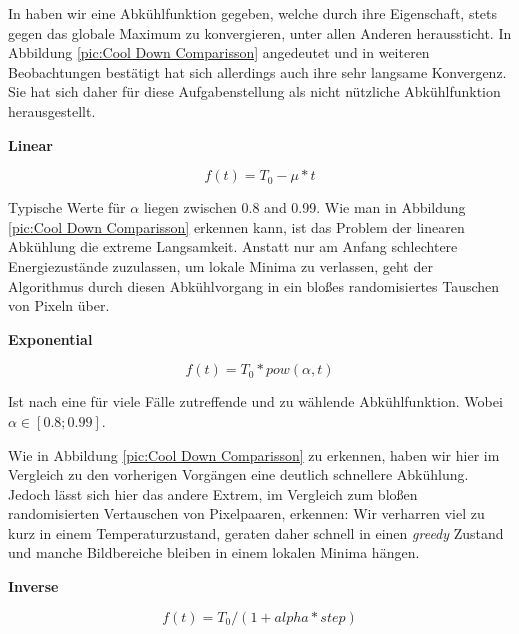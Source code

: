 In \cite{hajek1988cooling} haben wir eine Abkühlfunktion gegeben, welche durch ihre Eigenschaft,
stets gegen das globale Maximum zu konvergieren, unter allen Anderen heraussticht.
In Abbildung \ref{pic:Cool Down Comparisson} angedeutet und in weiteren Beobachtungen bestätigt hat sich 
allerdings auch ihre sehr langsame Konvergenz.
Sie hat sich daher für diese Aufgabenstellung als nicht nützliche Abkühlfunktion herausgestellt.

\textbf{Linear}
\begin{tcolorbox}[rightrule=3mm, rounded corners=east]
    \begin{equation}\label{eq:lineare Abkühlung}
        f(t) = T_0 - \mu*t
    \end{equation}
\end{tcolorbox}

Typische Werte für $\alpha$ liegen zwischen 0.8 and 0.99. Wie man in Abbildung \ref{pic:Cool Down Comparisson}
erkennen kann, ist das Problem der linearen Abkühlung die extreme Langsamkeit.
Anstatt nur am Anfang schlechtere Energiezustände zuzulassen, um lokale Minima zu verlassen, 
geht der Algorithmus durch diesen Abkühlvorgang in ein bloßes randomisiertes Tauschen von Pixeln über.

\textbf{Exponential}

\begin{tcolorbox}[rightrule=3mm, rounded corners=east]
    \begin{equation}\label{eq:Exponential}
        f(t) = T_0*pow(\alpha,t)
    \end{equation}
\end{tcolorbox}

Ist nach \cite{Kirkpatrick671} eine für viele Fälle zutreffende und zu wählende Abkühlfunktion.
Wobei $\alpha \in [0.8; 0.99]$.


Wie in Abbildung \ref{pic:Cool Down Comparisson} zu erkennen, haben wir hier im Vergleich zu den vorherigen Vorgängen
eine deutlich schnellere Abkühlung. Jedoch lässt sich hier das andere Extrem, im Vergleich zum bloßen randomisierten
Vertauschen von Pixelpaaren, erkennen: Wir verharren viel zu kurz in einem Temperaturzustand, geraten daher schnell 
in einen \textit{greedy} Zustand und manche Bildbereiche bleiben in einem lokalen Minima hängen.

\textbf{Inverse}

\begin{tcolorbox}[rightrule=3mm, rounded corners=east]
    \begin{equation}\label{eq:Inverse}
        f(t) = T_0 / (1 + alpha * step)
    \end{equation}
\end{tcolorbox}

